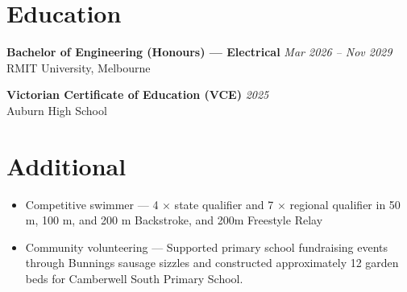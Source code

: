 \documentclass[11pt,a4paper]{article}
\begin{document}
\section*{Education}

\noindent\textbf{Bachelor of Engineering (Honours) — Electrical} \hfill \textit{Mar 2026 -- Nov 2029} \\
RMIT University, Melbourne

\noindent\textbf{Victorian Certificate of Education (VCE)} \hfill \textit{2025} \\
Auburn High School

\section*{Additional}
\begin{itemize}[leftmargin=*, noitemsep]
    \item Competitive swimmer — 4 $\times$ state qualifier and 7 $\times$ regional qualifier in 50 m, 100 m, and 200 m Backstroke, and 200m Freestyle Relay
    \item Community volunteering — Supported primary school fundraising events through Bunnings sausage sizzles and constructed approximately 12 garden beds for Camberwell South Primary School.
\end{itemize}
\end{document}
